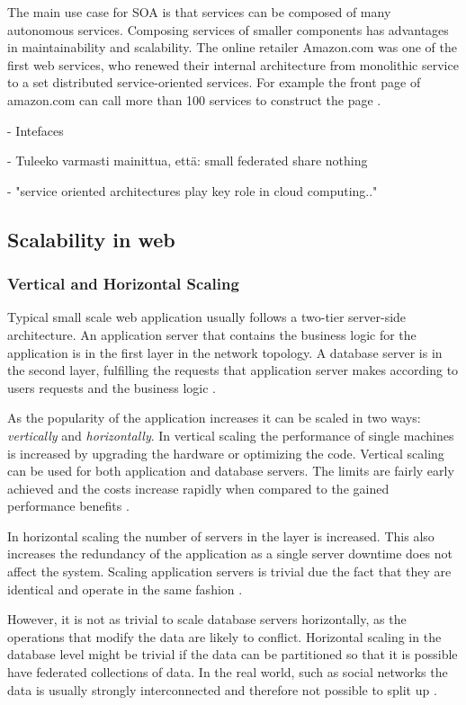 \documentclass{tktltiki}
\begin{document}
The main use case for SOA is that services can be composed of many autonomous services.  Composing services of smaller components has advantages in maintainability and scalability.  The online retailer Amazon.com was one of the first web services, who renewed their internal architecture from monolithic service to a set distributed service-oriented services.  For example the front page of amazon.com can call more than 100 services to construct the page \cite{vogels}.

- Intefaces

- Tuleeko varmasti mainittua, että: small federated share nothing

- "service oriented architectures play key role in cloud computing.." 



\subsection{Scalability in web}

\subsubsection{Vertical and Horizontal Scaling}

Typical small scale web application usually follows a two-tier server-side architecture. An application server that contains the business logic for the application is in the first layer in the network topology.  A database server is in the second layer, fulfilling the requests that application server makes according to users requests and the business logic \cite{PES10}.

As the popularity of the application increases it can be scaled in two ways: \emph{vertically} and \emph{horizontally}.  In vertical scaling the performance of single machines is increased by upgrading the hardware or optimizing the code.  Vertical scaling can be used for both application and database servers.  The limits are fairly early achieved and the costs increase rapidly when compared to the gained performance benefits \cite{PES10}.

In horizontal scaling the number of servers in the layer is increased.  This also increases the redundancy of the application as a single server downtime does not affect the system.  Scaling application servers is trivial due the fact that they are identical and operate in the same fashion \cite{PES10}.

However, it is not as trivial to scale database servers horizontally, as the operations that modify the data are likely to conflict.  Horizontal scaling in the database level might be trivial if the data can be partitioned so that it is possible have federated collections of data.  In the real world, such as social networks the data is usually strongly interconnected and therefore not possible to split up \cite{PES10}.
\end{document}
